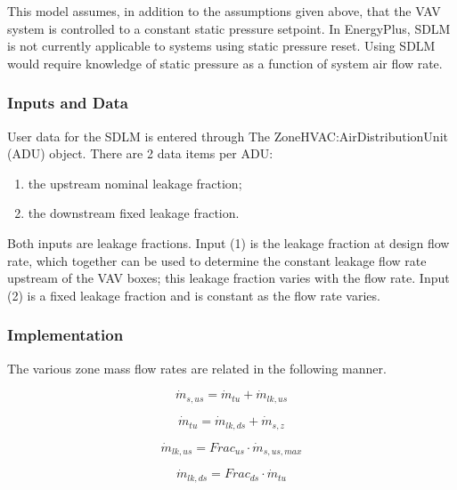 This model assumes, in addition to the assumptions given above, that the VAV system is controlled to a constant static pressure setpoint. In EnergyPlus, SDLM is not currently applicable to systems using static pressure reset. Using SDLM would require knowledge of static pressure as a function of system air flow rate.

\subsubsection{Inputs and Data}\label{inputs-and-data-3-000}

User data for the SDLM is entered through The ZoneHVAC:AirDistributionUnit (ADU) object. There are 2 data items per ADU:

\begin{enumerate}
\item the upstream nominal leakage fraction;
\item the downstream fixed leakage fraction.
\end{enumerate}

Both inputs are leakage fractions. Input (1) is the leakage fraction at design flow rate, which together can be used to determine the constant leakage flow rate upstream of the VAV boxes; this leakage fraction varies with the flow rate. Input (2) is a fixed leakage fraction and is constant as the flow rate varies.

\subsubsection{Implementation}\label{implementation-000}

The various zone mass flow rates are related in the following manner.

\begin{equation}
{\dot m_{s,us}} = {\dot m_{tu}} + {\dot m_{lk,us}}
\end{equation}

\begin{equation}
{\dot m_{tu}} = {\dot m_{lk,ds}} + {\dot m_{s,z}}
\end{equation}

\begin{equation}
{\dot m_{lk,us}} = Fra{c_{us}} \cdot {\dot m_{s,us,max}}
\end{equation}

\begin{equation}
{\dot m_{lk,ds}} = Fra{c_{ds}} \cdot {\dot m_{tu}}
\end{equation}


